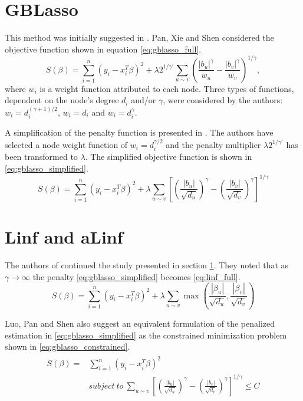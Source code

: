 \section{GBLasso} \label{sec:gblasso}
This method was initially suggested in \cite{pan2010incorporating}. Pan, Xie and Shen considered the objective function shown in equation \ref{eq:gblasso_full}. 
\begin{equation} \label{eq:gblasso_full}
S(\beta) = \sum_{i=1}^{n} (y_i - x_i^T\beta)^2 + \lambda2^{1/\gamma'}\sum_{u \sim v}\left(\frac{|b_u|^\gamma}{w_u}-\frac{|b_v|^\gamma}{w_v}\right)^{1/\gamma},
\end{equation}
where $w_i$ is a weight function attributed to each node. Three types of functions, dependent on the node's degree $d_i$ and/or $\gamma$, were considered by the authors: $w_i = d_i^{(\gamma+1)/2}$, $w_i = d_i$ and $w_i = d_i^\gamma$.

A simplification of the penalty function is presented in \cite{kim2013network}. The authors have selected a node weight function of $w_i = d_i^{\gamma/2}$ and the penalty multiplier $\lambda2^{1/\gamma'}$ has been transformed to $\lambda$. The simplified objective function is shown in \ref{eq:gblasso_simplified}.
\begin{equation} \label{eq:gblasso_simplified}
S(\beta) = \sum_{i=1}^{n} (y_i - x_i^T\beta)^2 + 
\lambda\sum_{u \sim v}
\left[\left(\frac{|b_u|}{\sqrt{d_u}}\right)^\gamma-
\left(\frac{|b_v|}{\sqrt{d_v}}\right)^\gamma\right]^{1/\gamma}
\end{equation}



\section{Linf and aLinf}
The authors of \cite{luo2012two} continued the study presented in section \ref{sec:gblasso}. They noted that as $\gamma\rightarrow\infty$ the penalty \ref{eq:gblasso_simplified} becomes \ref{eq:linf_full}.
\begin{equation} \label{eq:linf_full}
S(\beta) = \sum_{i=1}^{n} (y_i - x_i^T\beta)^2 + 
\lambda\sum_{u \sim v}\max\left(\frac{|\beta_u|}{\sqrt{d_u}},\frac{|\beta_v|}{\sqrt{d_v}}\right)
\end{equation}

Luo, Pan and Shen also suggest an equivalent formulation of the penalized estimation in \ref{eq:gblasso_simplified} as the constrained minimization problem shown in \ref{eq:gblasso_constrained}.
\begin{align} \label{eq:gblasso_constrained}
\begin{split}
S(\beta) = &\sum_{i=1}^{n} (y_i - x_i^T\beta)^2 \\ 
&subject\ to\ \sum_{u \sim v}
\left[\left(\frac{|b_u|}{\sqrt{d_u}}\right)^\gamma-
\left(\frac{|b_v|}{\sqrt{d_v}}\right)^\gamma\right]^{1/\gamma}\leq C
\end{split}
\end{align}

